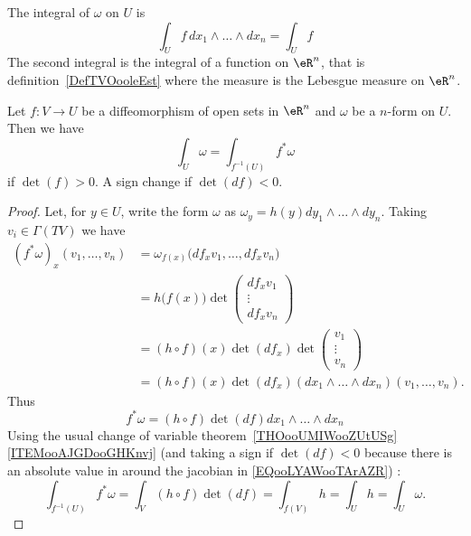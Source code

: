 \begin{definition}      \label{DEFooEYRFooRQTmRF}
    The integral of \( \omega\) on \( U\) is
    \begin{equation}
        \int_{U}f\,dx_1\wedge\ldots\wedge dx_n=\int_Uf
    \end{equation}
    The second integral is the integral of a function on \( \eR^n\), that is definition~\ref{DefTVOooleEst} where the measure is the Lebesgue measure on \( \eR^n\).
\end{definition}

\begin{lemma}       \label{LEMooNCYSooXtnCKq}
    Let \( f\colon V\to U\) be a diffeomorphism of open sets in \( \eR^n\) and \( \omega\) be a \( n\)-form on \( U\). Then we have
    \begin{equation}
        \int_U\omega=\int_{f^{-1}(U)}f^*\omega
    \end{equation}
    if \( \det(f)>0\). A sign change if \( \det(df)<0\).
\end{lemma}

\begin{proof}
    Let, for \( y\in U\), write the form \( \omega\) as \( \omega_y=h(y)dy_1\wedge\ldots\wedge dy_n\). Taking \( v_i\in \Gamma(TV)\) we have
    \begin{subequations}
        \begin{align}
            (f^*\omega)_x(v_1,\ldots, v_n)&=\omega_{f(x)}\big( df_xv_1,\ldots, df_xv_n \big)\\
            &=h\big( f(x) \big)\det\begin{pmatrix}
                df_xv_1    \\
                \vdots    \\
                df_xv_n
            \end{pmatrix}\\
            &=(h\circ f)(x)\det(df_x)\det\begin{pmatrix}
                v_1    \\
                \vdots    \\
                v_n
            \end{pmatrix}\\
            &=(h\circ f)(x)\det(df_x)(dx_1\wedge\ldots\wedge dx_n)(v_1,\ldots, v_n).
        \end{align}
    \end{subequations}
    Thus
    \begin{equation}
        f^*\omega= (h\circ f)\det(df)dx_1\wedge\ldots\wedge dx_n
    \end{equation}
    Using the usual change of variable theorem~\ref{THOooUMIWooZUtUSg}\ref{ITEMooAJGDooGHKnvj} (and taking a sign if \( \det(df)<0\) because there is an absolute value in around the jacobian in \eqref{EQooLYAWooTArAZR}) :
    \begin{equation}
        \int_{f^{-1}(U)}f^*\omega=\int_V(h\circ f)\det(df)=\int_{f(V)}h=\int_Uh=\int_U\omega.
    \end{equation}
\end{proof}

